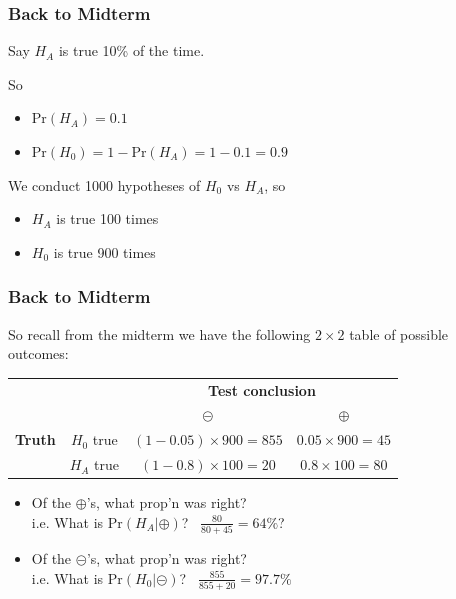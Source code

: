 \documentclass[slides]{beamer}
\newcommand{\prob}{\mbox{Pr}}
\newcommand{\cp}{\oplus}
\newcommand{\cm}{\circleddash}
\begin{document}
\begin{frame}
\frametitle{Back to Midterm}

Say $H_A$ is true 10\% of the time.

\vspace{0.25cm}

So 
\begin{itemize}
\item $\prob(H_A)=0.1$
\item $\prob(H_0) = 1- \prob(H_A) = 1-0.1=0.9$
\end{itemize}
\pause
\vspace{0.25cm}

We conduct 1000 hypotheses of $H_0$ vs $H_A$, so
\begin{itemize}
\item $H_A$ is true 100 times
\item $H_0$ is true 900 times
\end{itemize}



\end{frame}



\begin{frame}
\frametitle{Back to Midterm}

So recall from the midterm we have the following $2 \times 2$ table of possible outcomes:   

\begin{center}
  \begin{tabular}{cc|cc}
     \multicolumn{2}{c}{}  & \multicolumn{2}{c}{\textbf{Test conclusion}} \\ 
     &  & $\cm$ & $\cp$ \\ 
\hline
    \textbf{Truth} & $H_0$ true & $(1-0.05) \times 900 =  855$ & $0.05 \times 900 = 45$ \\
     & $H_A$ true & $(1-0.8)\times 100=20$ & $0.8\times 100= 80$\\ 
    \hline
  \end{tabular}
\end{center}

\begin{itemize}
\pause\item Of the $\cp$'s, what prop'n was right?\\
i.e. What is $\prob(H_A|\cp)$? \ $\frac{80}{80+45} = 64\%$?  
\pause\item Of the $\cm$'s, what prop'n was right?\\
i.e. What is $\prob(H_0|\cm)$? \ $\frac{855}{855+20} = 97.7\%$
\end{itemize}

\end{frame}
\end{document}
